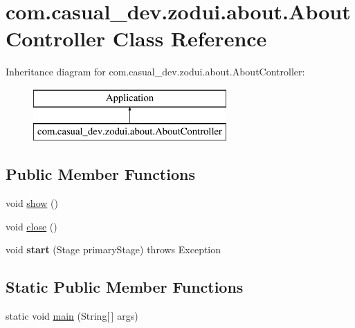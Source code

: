 \hypertarget{classcom_1_1casual__dev_1_1zodui_1_1about_1_1_about_controller}{\section{com.\-casual\-\_\-dev.\-zodui.\-about.\-About\-Controller Class Reference}
\label{classcom_1_1casual__dev_1_1zodui_1_1about_1_1_about_controller}
}
Inheritance diagram for com.\-casual\-\_\-dev.\-zodui.\-about.\-About\-Controller\-:\begin{figure}[H]
\begin{center}
\leavevmode
\includegraphics[height=2.000000cm]{classcom_1_1casual__dev_1_1zodui_1_1about_1_1_about_controller}
\end{center}
\end{figure}
\subsection*{Public Member Functions}
\begin{DoxyCompactItemize}
\item 
void \hyperlink{classcom_1_1casual__dev_1_1zodui_1_1about_1_1_about_controller_a5c691d51dd540a97ce32c7648d5b3775}{show} ()
\item 
void \hyperlink{classcom_1_1casual__dev_1_1zodui_1_1about_1_1_about_controller_acea5497cb125d90bf2ed84ee4e8bf03a}{close} ()
\item 
\hypertarget{classcom_1_1casual__dev_1_1zodui_1_1about_1_1_about_controller_a66842f87fdada962fd5b64950cb0f7af}{void {\bfseries start} (Stage primary\-Stage)  throws Exception }\label{classcom_1_1casual__dev_1_1zodui_1_1about_1_1_about_controller_a66842f87fdada962fd5b64950cb0f7af}

\end{DoxyCompactItemize}
\subsection*{Static Public Member Functions}
\begin{DoxyCompactItemize}
\item 
static void \hyperlink{classcom_1_1casual__dev_1_1zodui_1_1about_1_1_about_controller_ad01ba25018216c0ee5898bd8a4eb079b}{main} (String\mbox{[}$\,$\mbox{]} args)
\end{DoxyCompactItemize}


